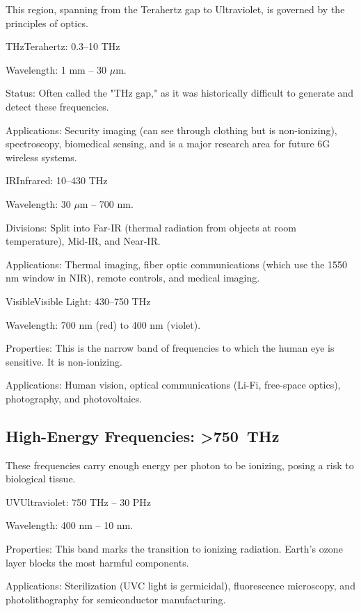 This region, spanning from the Terahertz gap to Ultraviolet, is governed by the principles of optics.

\begin{spectrumband}{THz}{Terahertz: 0.3--10 THz}
    \item[Wavelength:] 1 mm -- 30 $\mu$m.
    \item[Status:] Often called the "THz gap," as it was historically difficult to generate and detect these frequencies.
    \item[Applications:] Security imaging (can see through clothing but is non-ionizing), spectroscopy, biomedical sensing, and is a major research area for future 6G wireless systems.
\end{spectrumband}

\begin{spectrumband}{IR}{Infrared: 10--430 THz}
    \item[Wavelength:] 30 $\mu$m -- 700 nm.
    \item[Divisions:] Split into Far-IR (thermal radiation from objects at room temperature), Mid-IR, and Near-IR.
    \item[Applications:] Thermal imaging, fiber optic communications (which use the 1550 nm window in NIR), remote controls, and medical imaging.
\end{spectrumband}

\begin{spectrumband}{Visible}{Visible Light: 430--750 THz}
    \item[Wavelength:] 700 nm (red) to 400 nm (violet).
    \item[Properties:] This is the narrow band of frequencies to which the human eye is sensitive. It is non-ionizing.
    \item[Applications:] Human vision, optical communications (Li-Fi, free-space optics), photography, and photovoltaics.
\end{spectrumband}

\subsection{High-Energy Frequencies: >\qty{750}{THz}}

These frequencies carry enough energy per photon to be ionizing, posing a risk to biological tissue.

\begin{spectrumband}{UV}{Ultraviolet: 750 THz -- 30 PHz}
    \item[Wavelength:] 400 nm -- 10 nm.
    \item[Properties:] This band marks the transition to ionizing radiation. Earth's ozone layer blocks the most harmful components.
    \item[Applications:] Sterilization (UVC light is germicidal), fluorescence microscopy, and photolithography for semiconductor manufacturing.
\end{spectrumband}


